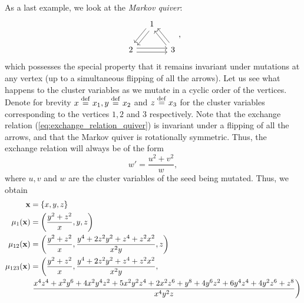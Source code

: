 \begin{example}\label{exmp:markov_quiver}
	As a last example, we look at the \emph{Markov quiver}:
	\begin{equation*}
		\begin{tikzcd}[column sep= small]
			& 1 \ar[ld, shift left] \ar[ld, shift right]\\
			2 \ar[rr, shift left] \ar[rr, shift right] && 3 \ar[lu, shift left] \ar[lu, shift right]
		\end{tikzcd},
	\end{equation*}
	which possesses the special property that it remains invariant under mutations at any
	vertex (up to a simultaneous flipping of all the arrows). Let us see what happens to
	the cluster variables as we mutate in a cyclic order of the vertices. Denote for
	brevity $x \overset{\mathrm{def}}{=} x_1, y \overset{\mathrm{def}}{=} x_2$ and $z \overset{\mathrm{def}}{=} x_3$ for the cluster variables
	corresponding to the vertices $1,2$ and $3$ respectively. Note that the exchange
	relation (\cref{eq:exchange_relation_quiver}) is invariant under a flipping of all the
	arrows, and that the Markov quiver is rotationally symmetric. Thus, the exchange
	relation will always be of the form
	\begin{equation}\label{eq:markov_exchange_relation}
		w' = \frac{u^2 + v^2}{w},
	\end{equation}
	where $u, v$ and $w$ are the cluster variables of the seed being mutated. Thus, we
	obtain
	\begin{align*}
		\bx            & = \{x, y, z\}                                                                                                                                                                              \\
		\mu_1(\bx)     & = \left(\frac{y^2 + z^2}{x}, y, z\right)                                                                                                                                                   \\
		\mu_{12}(\bx)  & = \left(\frac{y^2 + z^2}{x}, \frac{y^4 + 2 z^2y^2 +z^4 + z^2x^2 }{x^2y}, z\right)                                                                                                          \\
		\mu_{123}(\bx) & = \left(\frac{y^2 + z^2}{x}, \frac{y^4 + 2 z^2y^2 +z^4 + z^2x^2 }{x^2y},\right.                                                                                                            \\
		               & \left. \frac{x^{4} z^{4} + x^{2} y^{6} + 4 x^{2} y^{4} z^{2} + 5 x^{2} y^{2} z^{4} + 2 x^{2} z^{6} + y^{8} + 4 y^{6} z^{2} + 6 y^{4} z^{4} + 4 y^{2} z^{6} + z^{8}}{x^{4} y^{2} z} \right)

\end{align*}
\end{example}
